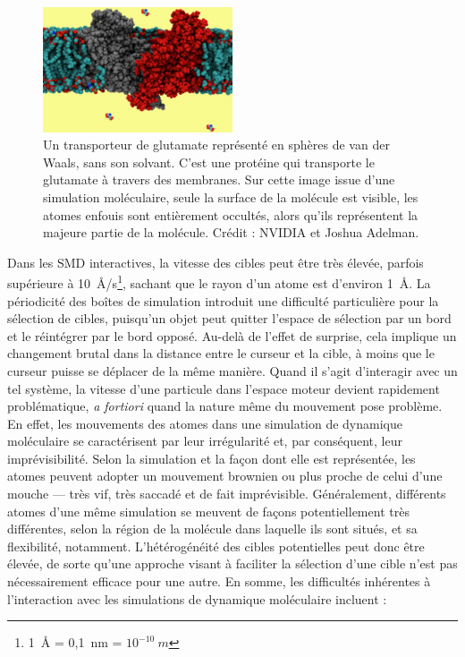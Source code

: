 	\begin{figure}%
		\centering
		\includegraphics[width=0.5\textwidth]{figures/ch1/gluTrans}
		\caption[Transporteur de glutamate, très forte occultation]{Un transporteur de glutamate représenté en sphères de van der Waals, sans son solvant. C'est une protéine qui transporte le glutamate à travers des membranes. Sur cette image issue d'une simulation moléculaire, seule la surface de la molécule est visible, les atomes \og enfouis \fg{} sont entièrement occultés, alors qu'ils représentent la majeure partie de la molécule. Crédit : NVIDIA et Joshua Adelman.\footnotemark{}}
		\label{fig:gluTrans}
	\end{figure}
	
	
	Dans les SMD interactives, la vitesse des cibles peut être très élevée, parfois supérieure à 10~\r{A}/s\footnote{1~\r{A} = 0,1~nm = $10^{-10}~m$}, sachant que le rayon d'un atome est d'environ 1~\r{A}. La périodicité des \og boîtes \fg{} de simulation introduit une difficulté particulière pour la sélection de cibles, puisqu'un objet peut quitter l'espace de sélection par un bord et le réintégrer par le bord opposé. Au-delà de l'effet de surprise, cela implique un changement brutal dans la distance entre le curseur et la cible, à moins que le curseur puisse se déplacer de la même manière. Quand il s'agit d'interagir avec un tel système, la vitesse d'une particule dans l'espace moteur devient rapidement problématique, \emph{a fortiori} quand la nature même du mouvement pose problème. En effet, les mouvements des atomes dans une simulation de dynamique moléculaire se caractérisent par leur irrégularité et, par conséquent, leur imprévisibilité. Selon la simulation et la façon dont elle est représentée, les atomes peuvent adopter un mouvement brownien ou plus proche de celui d'une mouche --- très vif, très saccadé et de fait imprévisible. Généralement, différents atomes d'une même simulation se meuvent de façons potentiellement très différentes, selon la région de la molécule dans laquelle ils sont situés, et sa flexibilité, notamment. L'hétérogénéité des cibles potentielles peut donc être élevée, de sorte qu'une approche visant à faciliter la sélection d'une cible n'est pas nécessairement efficace pour une autre. En somme, les difficultés inhérentes à l'interaction avec les simulations de dynamique moléculaire incluent :
	

